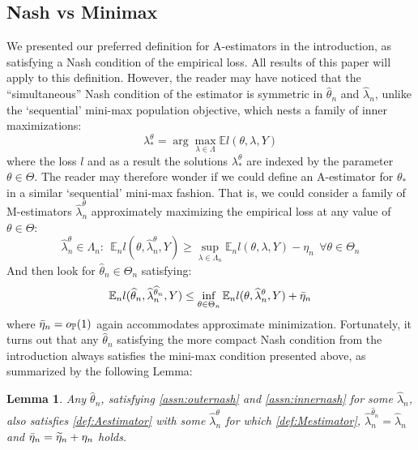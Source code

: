 \documentclass[12pt]{article}
\theoremstyle{myplain}
\newtheorem{lemma}{Lemma}[section]
\theoremstyle{definition}
\theoremstyle{definition}
\theoremstyle{remark}
\numberwithin{equation}{section}
\begin{document}
\subsection{Nash vs Minimax}\label{subsec:nashvsminimax}

We presented our preferred definition for A-estimators in the introduction, as satisfying a Nash condition of the empirical loss. All results of this paper will apply to this definition. However, the reader may have noticed that the ``simultaneous'' Nash condition of the estimator is symmetric in $\widehat{\theta}_n$ and $\widehat{\lambda}_n$, unlike the `sequential' mini-max population objective, which nests a family of inner maximizations:
\begin{equation}\label{def:Mestimand}
\lambda_*^\theta = \arg\max_{\lambda\in\Lambda} \mathbb{E} l(\theta, \lambda, Y)
\end{equation}
where the loss $l$ and as a result the solutions $\lambda_*^\theta$ are indexed by the parameter $\theta\in\Theta$. The reader may therefore wonder if we could define an A-estimator for $\theta_*$ in a similar `sequential' mini-max fashion. That is, we could consider a family of M-estimators $\widehat{\lambda}_{n}^\theta$ approximately maximizing the empirical loss at any value of $\theta\in\Theta$:
\begin{equation}
\label{def:Mestimator}
    \widehat{\lambda}_{n}^\theta\in\Lambda_n:\ \ \mathbb{E}_{n}l \left(\theta, \widehat{\lambda}_{n}^\theta,Y \right) \geq \sup_{\lambda \in \Lambda_{n}} \mathbb{E}_{n}l(\theta, \lambda, Y)-\eta_{n}\ \ \forall \theta\in\Theta_n
\end{equation}
And then look for $\widehat{\theta}_n\in\Theta_n$ satisfying: 
\begin{equation}
    \label{def:Aestimator}
    \mathbb{E}_n l(\widehat{\theta}_n, \widehat{\lambda}_n^{\widehat{\theta}_n}, Y) \leq \inf_{\theta\in\Theta_n} \mathbb{E}_n l(\theta, \widehat{\lambda}_n^{\theta}, Y) + \Bar \eta_{n}
\end{equation}
where $\Bar\eta_n=o_\mathbb{P}(1)$ again accommodates approximate minimization.
Fortunately, it turns out that any $\widehat\theta_n$ satisfying the more compact Nash condition from the introduction always satisfies the mini-max condition presented above, as summarized by the following Lemma:
\begin{lemma}
Any $\widehat\theta_n$, satisfying \ref{assn:outernash} and \ref{assn:innernash} for some $\widehat\lambda_n$, also satisfies \ref{def:Aestimator} with some $\widehat\lambda_n^\theta$ for which \ref{def:Mestimator}, $\widehat\lambda_n^{\widehat\theta_n}=\widehat\lambda_n$ and $\Bar\eta_n=\widetilde\eta_n + \eta_n$ holds.
\end{lemma}
\end{document}
